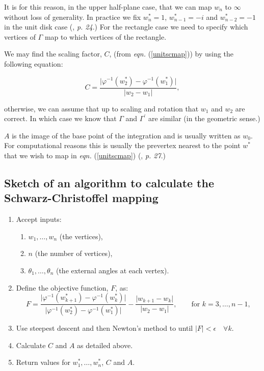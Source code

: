 \documentclass[a4paper,10pt]{amsart}
\newcommand{\sch}{Schwarz-Christoffel }
\newcommand{\eqn}[1]{\emph{eqn.} (\ref{#1})}
\newcommand{\phiinv}{\phi^{-1}}
\renewcommand{\phi}{\varphi}
\begin{document}
It is for this reason, in the upper half-plane case, that we can map $w_n$ to $\infty$ without loss of generality. In practice we fix $w^*_n=1$, $w^*_{n-1}=-i$ and $w^*_{n-2}=-1$ in the unit disk case (\cite{driscoll}, \emph{p. 24}.) For the rectangle case we need to specify which vertices of $\Gamma$ map to which vertices of the rectangle.

We may find the scaling factor, $C$, (from \eqn{unitscmap}) by using the following equation:

\begin{equation}
C=\frac{\vert \phiinv(w^*_2)-\phiinv(w^*_1)\vert}{\vert w_2 - w_1\vert},
\end{equation}

otherwise, we can assume that up to scaling and rotation that $w_1$ and $w_2$ are correct. In which case we know that $\Gamma$ and $\Gamma^\prime$ are similar (in the geometric sense.) 

$A$ is the image of the base point of the integration and is usually written as $w_0$. For computational reasons this is usually the prevertex nearest to the point $w^*$ that we wish to map in \eqn{unitscmap}  (\cite{driscoll}, \emph{p. 27}.)


\subsection{Sketch of an algorithm to calculate the \sch mapping}
\label{algorithmsketch}
\begin{enumerate}
\item Accept inputs:
   \begin{enumerate} 
      \item $w_1,\dots,w_n$ (the vertices),
      \item $n$ (the number of vertices),
      \item $\theta_1,\dots,\theta_n$ (the external angles at each vertex).
   \end{enumerate}
\item Define the objective function, $F$, as:
 \begin{equation*}
F=\frac{\vert \phi^{-1}(w^*_{k+1}) -  \phi^{-1}(w^*_k) \vert}{\vert \phi^{-1}(w^*_2)-\phi^{-1}(w^*_1)\vert} - \frac{\vert w_{k+1} - w_k\vert}{\vert w_2 - w_1\vert}, \qquad \text{for } k=3,\dots,n-1,
 \end{equation*}
\item Use steepest descent and then Newton's method to until $\vert F\vert < \epsilon \quad \forall k$. \item Calculate $C$ and $A$ as detailed above.
\item Return values for $w^*_1,\dots,w^*_n$, $C$ and $A$.
\end{enumerate}
\end{document}
